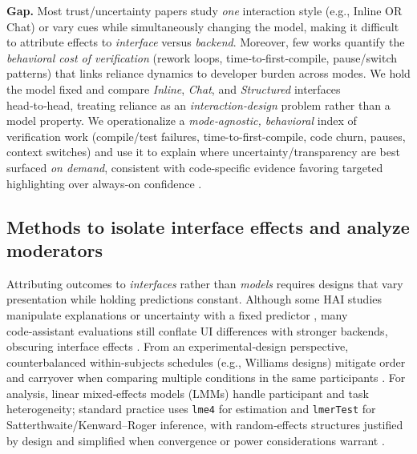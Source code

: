 \documentclass[sigconf]{acmart}
\begin{document}
\textbf{Gap.} Most trust/uncertainty papers study \emph{one} interaction style (e.g., Inline OR Chat) or vary cues while simultaneously changing the model, making it difficult to attribute effects to \emph{interface} versus \emph{backend}. Moreover, few works quantify the \emph{behavioral cost of verification} (rework loops, time‑to‑first‑compile, pause/switch patterns) that links reliance dynamics to developer burden across modes. We hold the model fixed and compare \emph{Inline}, \emph{Chat}, and \emph{Structured} interfaces head‑to‑head, treating reliance as an \emph{interaction‑design} problem rather than a model property. We operationalize a \emph{mode‑agnostic, behavioral} index of verification work (compile/test failures, time-to-first-compile, code churn, pauses, context switches) and use it to explain where uncertainty/transparency are best surfaced \emph{on demand}, consistent with code‑specific evidence favoring targeted highlighting over always‑on confidence \cite{vasconcelos2025generation,wang2024investigating,kim2024imNotSure,li2025confidenceAligns}.

\subsection{Methods to isolate interface effects and analyze moderators}
\label{sec:rw-methods}

Attributing outcomes to \emph{interfaces} rather than \emph{models} requires designs that vary presentation while holding predictions constant. Although some HAI studies manipulate explanations or uncertainty with a fixed predictor \cite{bansal2021does}, many code‑assistant evaluations still conflate UI differences with stronger backends, obscuring interface effects \cite{vasconcelos2025generation}. From an experimental‑design perspective, counterbalanced within‑subjects schedules (e.g., Williams designs) mitigate order and carryover when comparing multiple conditions in the same participants \cite{williams1949experimental}. For analysis, linear mixed‑effects models (LMMs) handle participant and task heterogeneity; standard practice uses \texttt{lme4} for estimation and \texttt{lmerTest} for Satterthwaite/Kenward–Roger inference, with random‑effects structures justified by design and simplified when convergence or power considerations warrant \cite{bates2015lme4,kuznetsova2017lmerTest,luke2017evaluatingLMM,matuschek2017typeIpower}. 
\end{document}
